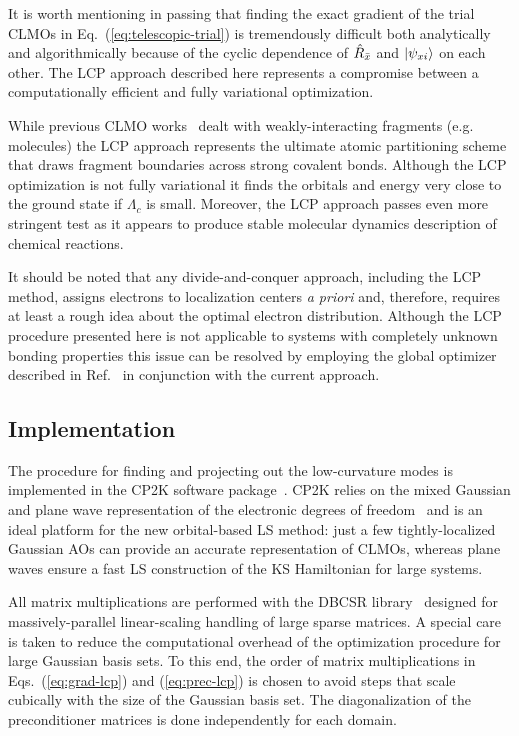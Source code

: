 \documentclass[10pt,amsmath,twocolumn,aps,prl,superscriptaddress,floatfix]{revtex4-1}
\begin{document}
It is worth mentioning in passing that finding the exact gradient of the trial CLMOs in Eq.~(\ref{eq:telescopic-trial}) is tremendously difficult both analytically and algorithmically because of the cyclic dependence of $\hat{R}_{\bar{x}}$ and $\vert \psi_{xi} \rangle$ on each other. The LCP approach described here represents a compromise between a computationally efficient and fully variational optimization.

While previous CLMO works~\cite{tsuchida2007augmented, tsuchida2008ab, khaliullin2013efficient} dealt with weakly-interacting fragments (e.g. molecules) the LCP approach represents the ultimate atomic partitioning scheme that draws fragment boundaries across strong covalent bonds. Although the LCP optimization is not fully variational it finds the orbitals and energy very close to the ground state if $\Lambda_c$ is small. Moreover, the LCP approach passes even more stringent test as it appears to produce stable molecular dynamics description of chemical reactions. 

It should be noted that any divide-and-conquer approach, including the LCP method, assigns electrons to localization centers \emph{a priori} and, therefore, requires at least a rough idea about the optimal electron distribution. Although the LCP procedure presented here is not applicable to systems with completely unknown bonding properties this issue can be resolved by employing the global optimizer described in Ref.~ in conjunction with the current approach.

\subsection{Implementation}

The procedure for finding and projecting out the low-curvature modes is implemented in the CP2K software package~\cite{www:cp2k}. CP2K relies on the mixed Gaussian and plane wave representation of the electronic degrees of freedom~\cite{vandevondele2005quickstep} and is an ideal platform for the new orbital-based LS method: just a few tightly-localized Gaussian AOs can provide an accurate representation of CLMOs, whereas plane waves ensure a fast LS construction of the KS Hamiltonian for large systems.

All matrix multiplications are performed with the DBCSR library~\cite{borvstnik2014sparse} designed for massively-parallel linear-scaling handling of large sparse matrices. 
A special care is taken to reduce the computational overhead of the optimization procedure for large Gaussian basis sets. 
To this end, the order of matrix multiplications in Eqs.~(\ref{eq:grad-lcp}) and (\ref{eq:prec-lcp}) is chosen to avoid steps that scale cubically with the size of the Gaussian basis set. 
The diagonalization of the preconditioner matrices is done independently for each domain. 
\end{document}
